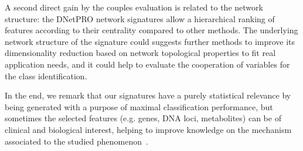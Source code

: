 \documentclass{standalone}
\begin{document}
A second direct gain by the couples evaluation is related to the network structure: the \textsf{DNetPRO} network signatures allow a hierarchical ranking of features according to their centrality compared to other methods.
The underlying network structure of the signature could suggests further methods to improve its dimensionality reduction based on network topological properties to fit real application needs, and it could help to evaluate the cooperation of variables for the class identification.

In the end, we remark that our signatures have a purely statistical relevance by being generated with a purpose of maximal classification performance, but sometimes the selected features (e.g. genes, DNA loci, metabolites) can be of clinical and biological interest, helping to improve knowledge on the mechanism associated to the studied phenomenon~\cite{PMrna, Scotlandi2009, PMgene, Terragna}.
\end{document}
